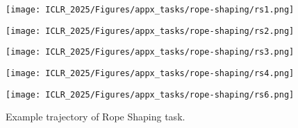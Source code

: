 \begin{figure*}[htb]
    \centering
    \begin{minipage}{0.19\textwidth}
            \centering
            \texttt{[image: ICLR\_2025/Figures/appx\_tasks/rope-shaping/rs1.png]}
    \end{minipage}
    \begin{minipage}{0.19\textwidth}
            \centering
            \texttt{[image: ICLR\_2025/Figures/appx\_tasks/rope-shaping/rs2.png]}
    \end{minipage}
    \begin{minipage}{0.19\textwidth}
            \centering
            \texttt{[image: ICLR\_2025/Figures/appx\_tasks/rope-shaping/rs3.png]}
    \end{minipage}
    \begin{minipage}{0.19\textwidth}
            \centering
            \texttt{[image: ICLR\_2025/Figures/appx\_tasks/rope-shaping/rs4.png]}
    \end{minipage}
    \begin{minipage}{0.19\textwidth}
            \centering
            \texttt{[image: ICLR\_2025/Figures/appx\_tasks/rope-shaping/rs6.png]}
    \end{minipage}

    \caption{
    Example trajectory of Rope Shaping task. 
    }
    \label{fig:appendix_rs_vis}
\end{figure*}